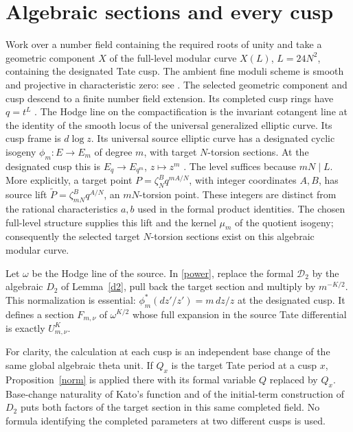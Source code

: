 \documentclass[11pt]{article}
\theoremstyle{remark}\newtheorem{remark}[theorem]{Remark}
\begin{document}
\section{Algebraic sections and every cusp}
Work over a number field containing the required roots of unity and take
a geometric component $X$ of the full-level modular curve $X(L)$,
$L=24N^2$, containing the designated Tate cusp. The ambient fine moduli
scheme is smooth and projective in characteristic zero: see
\cite[Theorems 4.1.1 and 4.2.1(2), Lemma 4.2.4]{conrad}.
The selected geometric component and cusp descend to a finite number
field extension. Its completed cusp rings have $q=t^L$
\cite[Lemma 4.1.7 and (4.2.1)]{conrad}. The Hodge line on the
compactification is the invariant cotangent line at the identity of the
smooth locus of the universal generalized elliptic curve. Its cusp frame
is $d\log z$.
Its universal source elliptic curve has a designated cyclic
isogeny $\phi_m:E\to E_m$ of degree $m$, with target $N$-torsion
sections. At the designated cusp this is
$E_q\to E_{q^m}$, $z\mapsto z^m$
\cite[Example 2.5.1]{conrad}.
The level suffices because $mN\mid L$. More explicitly, a target point
$P=\zeta_N^B q^{mA/N}$, with integer coordinates $A,B$, has source lift
$\widetilde P=\zeta_{mN}^B q^{A/N}$, an $mN$-torsion point.
These integers are distinct from the rational characteristics $a,b$ used
in the formal product identities.
The chosen full-level structure supplies this lift and the kernel
$\mu_m$ of the quotient isogeny; consequently the selected target
$N$-torsion sections exist on this algebraic modular curve.

Let $\omega$ be the Hodge line of the source. In \eqref{power}, replace
the formal $\mathcal D_2$ by the algebraic $D_2$ of Lemma~\ref{d2},
pull back the target section and multiply by $m^{-K/2}$. This normalization is
essential: $\phi_m^*(dz'/z')=m\,dz/z$ at the designated cusp.
It defines a section $F_{m,\nu}$ of $\omega^{K/2}$ whose full expansion
in the source Tate differential is exactly $U_{m,\nu}^K$.

For clarity, the calculation at each cusp is an independent base
change of the same global algebraic theta unit. If $Q_x$ is the target
Tate period at a cusp $x$, Proposition~\ref{norm} is applied there with
its formal variable $Q$ replaced by $Q_x$. Base-change naturality of
Kato's function and of the initial-term construction of $D_2$ puts both
factors of the target section in this same completed field. No formula
identifying the completed parameters at two different cusps is used.
\end{document}
